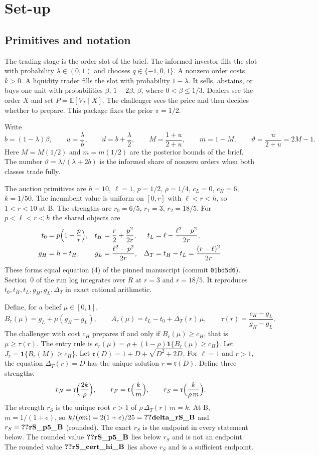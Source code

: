 \documentclass[12pt]{article}
\theoremstyle{definition}
\newcommand{\E}{\mathbb E}
\newcommand{\fr}{\mathfrak r}
\newcommand{\one}{\mathbf 1}
\newcommand{\cH}{c_H}
\begin{document}
\section{Set-up}\label{sec:setup}

\subsection{Primitives and notation}

The trading stage is the order slot of the brief.
The informed investor fills the slot with probability $\lambda\in(0,1)$ and chooses $q\in\{-1,0,1\}$.
A nonzero order costs $k>0$.
A liquidity trader fills the slot with probability $1-\lambda$.
It sells, abstains, or buys one unit with probabilities $\beta$, $1-2\beta$, $\beta$, where $0<\beta\le 1/3$.
Dealers see the order $X$ and set $P=\E[V_T\mid X]$.
The challenger sees the price and then decides whether to prepare.
This package fixes the prior $\pi=1/2$.

Write
\[
b=(1-\lambda)\beta,\qquad u=\frac{\lambda}{b},\qquad d=b+\frac{\lambda}{2},\qquad
M=\frac{1+u}{2+u},\qquad m=1-M,\qquad \vartheta=\frac{u}{2+u}=2M-1 .
\]
Here $M=M(1/2)$ and $m=m(1/2)$ are the posterior bounds of the brief.
The number $\vartheta=\lambda/(\lambda+2b)$ is the informed share of nonzero orders when both classes trade fully.

The auction primitives are $h=10$, $\ell=1$, $p=1/2$, $\rho=1/4$, $c_L=0$, $c_H=6$, $k=1/50$.
The incumbent value is uniform on $[0,r]$ with $\ell<r<h$, so $1<r<10$ at B.
The strengths are $r_0=6/5$, $r_1=3$, $r_2=18/5$.
For $p<\ell<r<h$ the shared objects are
\[
\begin{aligned}
t_0&=p\Bigl(1-\frac pr\Bigr), & t_H&=\frac r2+\frac{p^2}{2r}, & t_L&=\ell-\frac{\ell^2-p^2}{2r},\\
g_H&=h-t_H, & g_L&=\frac{\ell^2-p^2}{2r}, & \Delta_T&=t_H-t_L=\frac{(r-\ell)^2}{2r}.
\end{aligned}
\]
These forms equal equation (4) of the pinned manuscript (commit \texttt{01bd5d6}).
Section~0 of the run log integrates over $R$ at $r=3$ and $r=18/5$.
It reproduces $t_0,t_H,t_L,g_H,g_L,\Delta_T$ in exact rational arithmetic.

Define, for a belief $\mu\in[0,1]$,
\[
B_r(\mu)=g_L+\mu(g_H-g_L),\qquad
A_r(\mu)=t_L-t_0+\Delta_T(r)\,\mu,\qquad
\tau(r)=\frac{\cH-g_L}{g_H-g_L}.
\]
The challenger with cost $c_H$ prepares if and only if $B_r(\mu)\ge\cH$, that is $\mu\ge\tau(r)$.
The entry rule is $e_r(\mu)=\rho+(1-\rho)\one\{B_r(\mu)\ge\cH\}$.
Let $J_r=\one\{B_r(M)\ge\cH\}$.
Let $\fr(D)=1+D+\sqrt{D^2+2D}$.
For $\ell=1$ and $r>1$, the equation $\Delta_T(r)=D$ has the unique solution $r=\fr(D)$.
Define three strengths:
\[
r_N=\fr\Bigl(\frac{2k}{\rho}\Bigr),\qquad
r_F=\fr\Bigl(\frac{k}{m}\Bigr),\qquad
r_S=\fr\Bigl(\frac{k}{\rho\, m}\Bigr).
\]
The strength $r_S$ is the unique root $r>1$ of $\rho\,\Delta_T(r)\,m=k$.
At B, $m=1/(1+e)$, so $k/(\rho m)=2(1+e)/25=\reg{delta_rS_B}$ and $r_S=\reg{rS_p5_B}$ (rounded).
The exact $r_S$ is the endpoint in every statement below.
The rounded value $\reg{rS_p5_B}$ lies below $r_S$ and is not an endpoint.
The rounded value $\reg{rS_cert_hi_B}$ lies above $r_S$ and is a sufficient endpoint.
\end{document}
